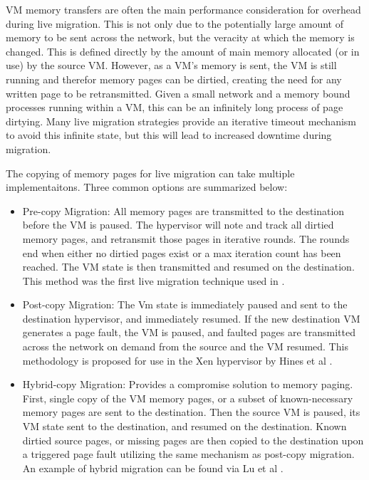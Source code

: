 VM memory transfers are often the main performance consideration for overhead during live migration. This is not only due to the potentially large amount of memory to be sent across the network, but the veracity at which the memory is changed.  This is defined directly by the amount of main memory allocated (or in use) by the source VM. However, as a VM's memory is sent, the VM is still running and therefor memory pages can be dirtied, creating the need for any written page to be retransmitted. Given a small network and a memory bound processes running within a VM, this can be an infinitely long process of page dirtying. Many live migration strategies provide an iterative timeout mechanism to avoid this infinite state, but this will lead to increased downtime during migration.  

The copying of memory pages for live migration can take multiple implementaitons. Three common options are summarized below:

\begin{itemize}
\item Pre-copy Migration:  All memory pages are transmitted to the destination before the VM is paused. The hypervisor will note and track all dirtied memory pages, and retransmit those pages in iterative rounds. The rounds end when either no dirtied pages exist or a max iteration count has been reached. The VM state is then transmitted and resumed on the destination. This method was the first live migration technique used in \cite{clark2005live}. 
\item Post-copy Migration: The Vm state is immediately paused and sent to the destination hypervisor, and immediately resumed. If the new destination VM generates a page fault, the VM is paused, and faulted pages are transmitted across the network on demand from the source and the VM resumed.  This methodology is proposed for use in the Xen hypervisor by Hines et al \cite{hines2009post}. 
\item Hybrid-copy Migration: Provides a compromise solution to memory paging. First, single copy of the VM memory pages, or a subset of known-necessary memory pages are sent to the destination.  Then the source VM is paused, its VM state sent to the destination, and resumed on the destination.  Known dirtied source pages, or missing pages are then copied to the destination upon a triggered page fault utilizing the same mechanism as post-copy migration. An example of hybrid migration can be found via Lu et al \cite{Lu2013}. 
\end{itemize}

